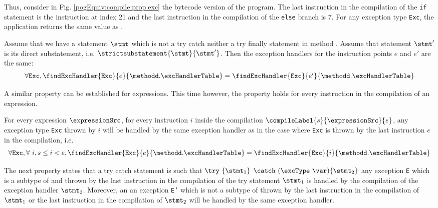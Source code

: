 Thus, consider in Fig. \ref{pogEquiv:compile:prop:exc} 
the bytecode version of the program. The last  instruction in the compilation of the \lstinline!if! statement is the 
instruction at index 21 and the last instruction in the compilation of the \lstinline!else! branch is 7. 
For any exception type \mbox{\rm\tt{Exc}}, the application  returns the same value  as
. 

\begin{compProp}\label{compile:prop:compProp8}
 Assume that we have a statement  $\stmt$  which is not a try catch  neither a try finally statement in method \methodd. Assume that 
  statement $\stmt'$ is its direct substatement, i.e. 
$\strictsubstatement{\stmt}{\stmt'} $. 
Then the exception handlers for the instruction points $e$ and $e'$ are the same:
$$ \begin{array}{l}
          \forall \mbox{\rm\tt{Exc}}, \findExcHandler{\mbox{\rm\tt{Exc}} }{e}{\methodd.\excHandlerTable} = 
	 \findExcHandler{\mbox{\rm\tt{Exc}} }{e'}{\methodd.\excHandlerTable} 
   \end{array}
$$


\end{compProp}

A similar property can be established for expressions. This time however, the property holds for
every instruction in the compilation of an expression.
 
\begin{compProp}\label{compile:prop:compProp9}
  For every expression $\expressionSrc$,
  for every instruction $i$ inside the compilation  $\compileLabel{s}{\expressionSrc}{e}$,
  any exception type \mbox{\rm\tt{Exc}} thrown by  $i$  will be handled by the same exception handler 
  as in the case where \mbox{\rm\tt{Exc}}   is thrown by the last instruction $e$ in the compilation, i.e.
$$ \begin{array}{l}
          \forall \mbox{\rm\tt{Exc}}, \forall  \ i, s \le i < e , 
	   \findExcHandler{\mbox{\rm\tt{Exc}} }{e}{\methodd.\excHandlerTable} = 
	  \findExcHandler{\mbox{\rm\tt{Exc}} }{i}{\methodd.\excHandlerTable} 
   \end{array}
$$
\end{compProp}

The next property states that a try catch statement is such that $ \try \ \{ \stmt_1 \} $ $ \catch \ (\excType \ \var )\{ \stmt_2 \}  $ 
any exception \texttt{E} which is a subtype of \excType{} and thrown by  the last instruction in the compilation of the try statement $ \stmt_1 $ is handled by the 
compilation of the exception handler $\stmt_2$. Moreover, an 
 an exception \texttt{E'} which is not a subtype of \excType{} thrown by the  last instruction in the compilation of $\stmt_1$
or the last instruction  in the compilation of $\stmt_2$ will be handled by the same exception handler. 

